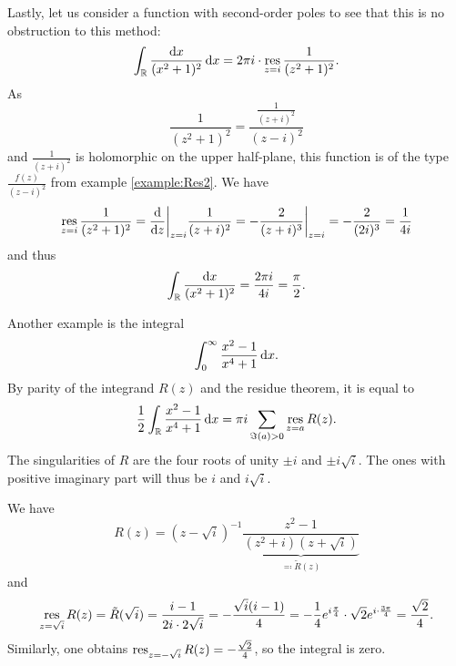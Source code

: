 \documentclass[a4paper,english]{article}
\begin{document}
\begin{example}
    Lastly, let us consider a function with second-order poles to see that this is no obstruction to this method:
    \begin{equation*}
        \int_{\operatorname{\mathbb{R}}} \frac{\mathop{}\!\mathrm{d}{x}}{(x^2 + 1)^2} \mathop{}\!\mathrm{d}{x}
        = 2 \pi i \cdot \operatorname*{res}_{z = i} \frac{1}{(z^2 + 1)^2}.
    \end{equation*}
    As
    \begin{equation*}
        \frac{1}{(z^2 + 1)^2}
        = \frac{\frac{1}{(z + i)^2}}{(z - i)^2}
    \end{equation*}
    and $\frac{1}{(z + i)^2}$ is holomorphic on the upper half-plane, this function is of the type $\frac{f(z)}{(z - i)^2}$ from example \ref{example:Res2}.
    We have
    \begin{equation*}
        \operatorname*{res}_{z = i} \frac{1}{(z^2 + 1)^2}
        = \frac{\mathop{}\!\mathrm{d}}{\mathop{}\!\mathrm{d}{z}}\bigg|_{z = i} \frac{1}{(z + i)^2}
        = - \frac{2}{(z + i)^3} \bigg|_{z = i}
        = - \frac{2}{(2 i)^3}
        = \frac{1}{4i}
    \end{equation*}
    and thus
    \begin{equation*}
        \int_{\operatorname{\mathbb{R}}} \frac{\mathop{}\!\mathrm{d}{x}}{(x^2 + 1)^2}
        = \frac{2 \pi i}{4 i}
        = \frac{\pi}{2}.
    \end{equation*}
    
    Another example is the integral
    \begin{equation*}
        \int_{0}^{\infty} \frac{x^2 - 1}{x^4 + 1} \mathop{}\!\mathrm{d}{x}.
    \end{equation*}
    By  parity of the integrand $R(z)$ and the residue theorem, it is equal to
    \begin{equation*}
        \frac{1}{2} \int_{\operatorname{\mathbb{R}}} \frac{x^2 - 1}{x^4 + 1} \mathop{}\!\mathrm{d}{x}
        = \pi i \sum_{\Im(a) > 0} \operatorname*{res}_{z = a} R(z). 
    \end{equation*}
    The singularities of $R$ are the four roots of unity $\pm i$ and $\pm i \sqrt{i}$.
    The ones with positive imaginary part will thus be $i$ and $i \sqrt{i}$.
    
    We have
    \begin{equation*}
        R(z)
        = (z - \sqrt{i})^{-1} \underbrace{\frac{z^2 - 1}{(z^2 + i)(z + \sqrt{i})}}_{\eqqcolon \tilde{R}(z)}
    \end{equation*}
    and 
    \begin{equation*}
        \operatorname*{res}_{z = \sqrt{i}} R(z)
        = \tilde{R}(\sqrt{i})
        = \frac{i - 1}{2 i \cdot 2 \sqrt{i}}
        = - \frac{\sqrt{i} (i - 1)}{4}
        = - \frac{1}{4} e^{i \frac{\pi}{4}} \cdot \sqrt{2} e^{i \cdot \frac{3 \pi}{4}}
        = \frac{\sqrt{2}}{4}.
    \end{equation*}
    Similarly, one obtains $\operatorname*{res}_{z = -\sqrt{i}} R(z) = - \frac{\sqrt{2}}{4}$, so the integral is zero.
\end{example}
\end{document}

